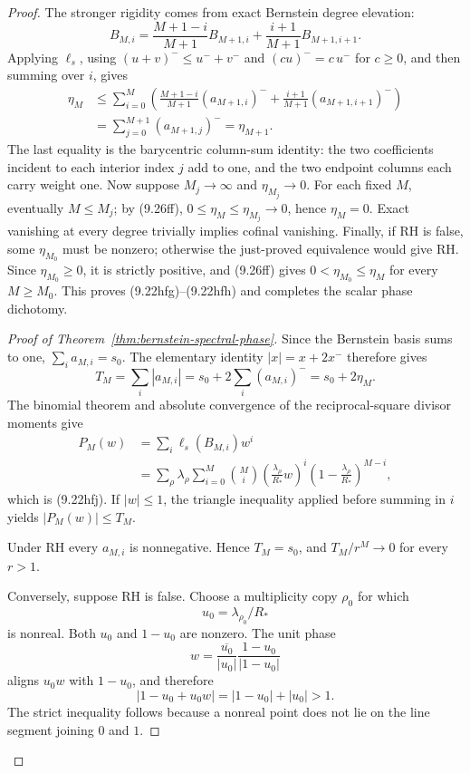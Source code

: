 \documentclass[11pt]{article}
\begin{document}
\begin{proof}
The stronger rigidity comes from exact Bernstein degree elevation:
\[
 B_{M,i}
 =\frac{M+1-i}{M+1}B_{M+1,i}
  +\frac{i+1}{M+1}B_{M+1,i+1}.
 \tag{9.26fe}
\]
Applying $\ell_s$, using $(u+v)^-\le u^-+v^-$ and
$(cu)^-=c\,u^-$ for $c\ge0$, and then summing over $i$, gives
\[
 \begin{aligned}
 \eta_M
 &\le\sum_{i=0}^M
 \left(\frac{M+1-i}{M+1}(a_{M+1,i})^-
 +\frac{i+1}{M+1}(a_{M+1,i+1})^-\right)\\
 &=\sum_{j=0}^{M+1}(a_{M+1,j})^-=\eta_{M+1}.
 \end{aligned}
 \tag{9.26ff}
\]
The last equality is the barycentric column-sum identity: the two coefficients incident to each
interior index $j$ add to one, and the two endpoint columns each carry weight one.
Now suppose $M_j\to\infty$ and $\eta_{M_j}\to0$.  For each fixed $M$, eventually $M\le M_j$;
by \textup{(9.26ff)},
$0\le\eta_M\le\eta_{M_j}\to0$, hence $\eta_M=0$.  Exact vanishing at every degree trivially
implies cofinal vanishing.  Finally, if RH is false, some $\eta_{M_0}$ must be nonzero; otherwise
the just-proved equivalence would give RH.  Since $\eta_{M_0}\ge0$, it is strictly positive, and
\textup{(9.26ff)} gives $0<\eta_{M_0}\le\eta_M$ for every $M\ge M_0$.  This proves
\textup{(9.22hfg)}--\textup{(9.22hfh)} and completes the scalar phase dichotomy.

\begin{proof}[Proof of Theorem~\ref{thm:bernstein-spectral-phase}]
Since the Bernstein basis sums to one,
$\sum_i a_{M,i}=s_0$.  The elementary identity
$|x|=x+2x^-$ therefore gives
\[
 T_M=\sum_i|a_{M,i}|=s_0+2\sum_i(a_{M,i})^-=s_0+2\eta_M.
 \tag{9.26fpa}
\]
The binomial theorem and absolute convergence of the reciprocal-square divisor moments give
\[
 \begin{aligned}
 P_M(w)
 &=\sum_i\ell_s(B_{M,i})w^i\\
 &=\sum_\rho\lambda_\rho
   \sum_{i=0}^M\binom Mi
   \left(\frac{\lambda_\rho}{R_*}w\right)^i
   \left(1-\frac{\lambda_\rho}{R_*}\right)^{M-i},
 \end{aligned}
\]
which is \textup{(9.22hfj)}.  If $|w|\le1$, the triangle inequality applied before summing in
$i$ yields $|P_M(w)|\le T_M$.

Under RH every $a_{M,i}$ is nonnegative.  Hence $T_M=s_0$, and
$T_M/r^M\to0$ for every $r>1$.

Conversely, suppose RH is false.  Choose a multiplicity copy $\rho_0$ for which
\[
 u_0=\lambda_{\rho_0}/R_*
\]
is nonreal.  Both $u_0$ and $1-u_0$ are nonzero.  The unit phase
\[
 w=\frac{\overline{u_0}}{|u_0|}
   \frac{1-u_0}{|1-u_0|}
 \tag{9.26fpb}
\]
aligns $u_0w$ with $1-u_0$, and therefore
\[
 |1-u_0+u_0w|=|1-u_0|+|u_0|>1.
 \tag{9.26fpc}
\]
The strict inequality follows because a nonreal point does not lie on the line segment joining
$0$ and $1$.


\end{proof}
\end{proof}
\end{document}
